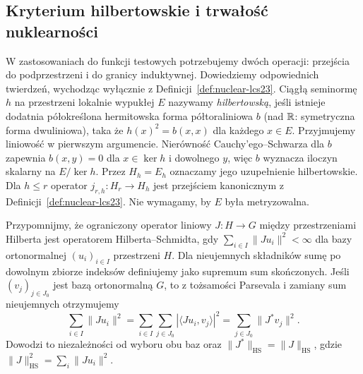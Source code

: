\subsection{Kryterium hilbertowskie i trwałość nuklearności}
\label{subsec:nuclear-permanence23}

W zastosowaniach do funkcji testowych potrzebujemy dwóch operacji:
przejścia do podprzestrzeni i do granicy induktywnej. Dowiedziemy
odpowiednich twierdzeń, wychodząc wyłącznie z
Definicji~\ref{def:nuclear-lcs23}. Ciągłą seminormę $h$ na przestrzeni lokalnie wypukłej $E$
nazywamy \emph{hilbertowską}, jeśli istnieje dodatnia
półokreślona hermitowska forma półtoraliniowa $b$ (nad $\mathbb R$:
symetryczna forma dwuliniowa), taka że $h(x)^2=b(x,x)$
dla każdego $x\in E$. Przyjmujemy liniowość w pierwszym
argumencie. Nierówność Cauchy'ego--Schwarza dla $b$
zapewnia $b(x,y)=0$ dla $x\in\ker h$ i dowolnego $y$,
więc $b$ wyznacza iloczyn skalarny na $E/\ker h$.
Przez $H_h=E_h$ oznaczamy jego uzupełnienie hilbertowskie.
Dla $h\le r$ operator $j_{r,h}:H_r\to H_h$ jest
przejściem kanonicznym z Definicji~\ref{def:nuclear-lcs23}.
Nie wymagamy, by $E$ była metryzowalna.

Przypomnijmy, że ograniczony operator liniowy $J:H\to G$
między przestrzeniami Hilberta jest operatorem
Hilberta--Schmidta, gdy $\sum_{i\in I}\|Ju_i\|^2<\infty$
dla bazy ortonormalnej $(u_i)_{i\in I}$ przestrzeni $H$.
Dla nieujemnych składników sumę po dowolnym zbiorze
indeksów definiujemy jako supremum sum skończonych.
Jeśli $(v_j)_{j\in J_0}$ jest bazą ortonormalną $G$,
to z tożsamości Parsevala i zamiany sum nieujemnych
otrzymujemy
\[
 \sum_{i\in I}\|Ju_i\|^2
 =\sum_{i\in I}\sum_{j\in J_0}|\langle Ju_i,v_j\rangle|^2
 =\sum_{j\in J_0}\|J^*v_j\|^2.
\]
Dowodzi to niezależności od wyboru obu baz oraz
$\|J^*\|_{\mathrm{HS}}=\|J\|_{\mathrm{HS}}$, gdzie
$\|J\|_{\mathrm{HS}}^2=\sum_i\|Ju_i\|^2$.


